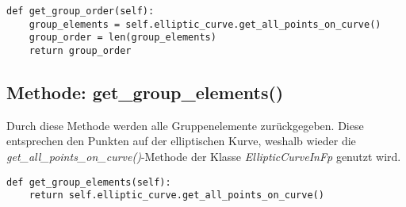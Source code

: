 \vspace{\baselineskip}
\begin{lstlisting}[caption={Methode: get\_group\_order()}, captionpos=b]
def get_group_order(self):
    group_elements = self.elliptic_curve.get_all_points_on_curve()
    group_order = len(group_elements)
    return group_order
\end{lstlisting}
\vspace{\baselineskip}

\subsection{Methode: get\_group\_elements()}
Durch diese Methode werden alle Gruppenelemente zurückgegeben. Diese entsprechen den Punkten auf der elliptischen Kurve, weshalb wieder die \textit{get\_all\_points\_on\_curve()}-Methode der Klasse \textit{EllipticCurveInFp} genutzt wird.

\vspace{\baselineskip}
\begin{lstlisting}[caption={Methode: get\_group\_elements()}, captionpos=b]
def get_group_elements(self):
	return self.elliptic_curve.get_all_points_on_curve()
\end{lstlisting}
\vspace{\baselineskip}
  
